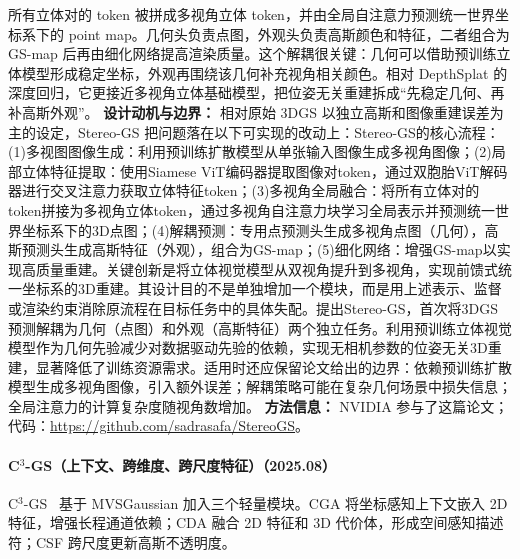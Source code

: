 所有立体对的 token 被拼成多视角立体 token，并由全局自注意力预测统一世界坐标系下的 point map。几何头负责点图，外观头负责高斯颜色和特征，二者组合为 GS-map 后再由细化网络提高渲染质量。这个解耦很关键：几何可以借助预训练立体模型形成稳定坐标，外观再围绕该几何补充视角相关颜色。相对 DepthSplat 的深度回归，它更接近多视角立体基础模型，把位姿无关重建拆成“先稳定几何、再补高斯外观”。
\textbf{设计动机与边界：} 相对原始 3DGS 以独立高斯和图像重建误差为主的设定，Stereo-GS 把问题落在以下可实现的改动上：Stereo-GS的核心流程：(1)多视图图像生成：利用预训练扩散模型从单张输入图像生成多视角图像；(2)局部立体特征提取：使用Siamese ViT编码器提取图像对token，通过双胞胎ViT解码器进行交叉注意力获取立体特征token；(3)多视角全局融合：将所有立体对的token拼接为多视角立体token，通过多视角自注意力块学习全局表示并预测统一世界坐标系下的3D点图；(4)解耦预测：专用点预测头生成多视角点图（几何），高斯预测头生成高斯特征（外观），组合为GS-map；(5)细化网络：增强GS-map以实现高质量重建。关键创新是将立体视觉模型从双视角提升到多视角，实现前馈式统一坐标系的3D重建。其设计目的不是单独增加一个模块，而是用上述表示、监督或渲染约束消除原流程在目标任务中的具体失配。提出Stereo-GS，首次将3DGS预测解耦为几何（点图）和外观（高斯特征）两个独立任务。利用预训练立体视觉模型作为几何先验减少对数据驱动先验的依赖，实现无相机参数的位姿无关3D重建，显著降低了训练资源需求。适用时还应保留论文给出的边界：依赖预训练扩散模型生成多视角图像，引入额外误差；解耦策略可能在复杂几何场景中损失信息；全局注意力的计算复杂度随视角数增加。
\textbf{方法信息：} NVIDIA 参与了这篇论文；代码：\url{https://github.com/sadrasafa/StereoGS}。



\paragraph{C$^3$-GS（上下文、跨维度、跨尺度特征）（2025.08）}
C$^3$-GS~\cite{2508_20754} 基于 MVSGaussian 加入三个轻量模块。CGA 将坐标感知上下文嵌入 2D 特征，增强长程通道依赖；CDA 融合 2D 特征和 3D 代价体，形成空间感知描述符；CSF 跨尺度更新高斯不透明度。

